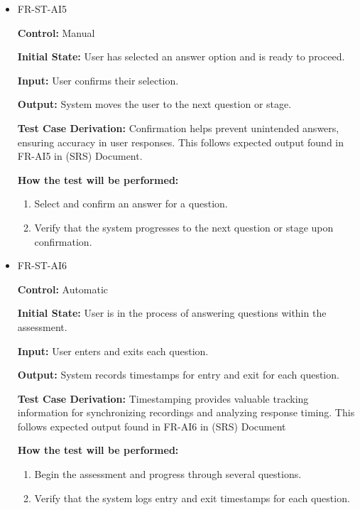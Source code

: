 \documentclass[12pt, titlepage]{article}
\begin{document}
\begin{itemize}
  \item FR-ST-AI5
    \begin{mdframed}[linewidth=0.5mm]
      \textbf{Control:} Manual \par
      \textbf{Initial State:} User has selected an answer option and is ready to proceed. \par
      \textbf{Input:} User confirms their selection. \par
      \textbf{Output:} System moves the user to the next question or stage. \par
      \textbf{Test Case Derivation:} Confirmation helps prevent unintended answers, ensuring 
      accuracy in user responses. This follows expected output found in FR-AI5 in (SRS) Document. \par
      \textbf{How the test will be performed:}
      \begin{enumerate}[noitemsep]
        \item Select and confirm an answer for a question.
        \item Verify that the system progresses to the next question or stage upon confirmation.
      \end{enumerate}
    \end{mdframed}

  \item FR-ST-AI6
    \begin{mdframed}[linewidth=0.5mm]
      \textbf{Control:} Automatic \par
      \textbf{Initial State:} User is in the process of answering questions within the assessment. \par
      \textbf{Input:} User enters and exits each question. \par
      \textbf{Output:} System records timestamps for entry and exit for each question. \par
      \textbf{Test Case Derivation:} Timestamping provides valuable tracking information for 
      synchronizing recordings and analyzing response timing. 
      This follows expected output found in FR-AI6 in (SRS) Document \par
      \textbf{How the test will be performed:}
      \begin{enumerate}[noitemsep]
        \item Begin the assessment and progress through several questions.
        \item Verify that the system logs entry and exit timestamps for each question.
      \end{enumerate}
    \end{mdframed}


\end{itemize}
\end{document}
